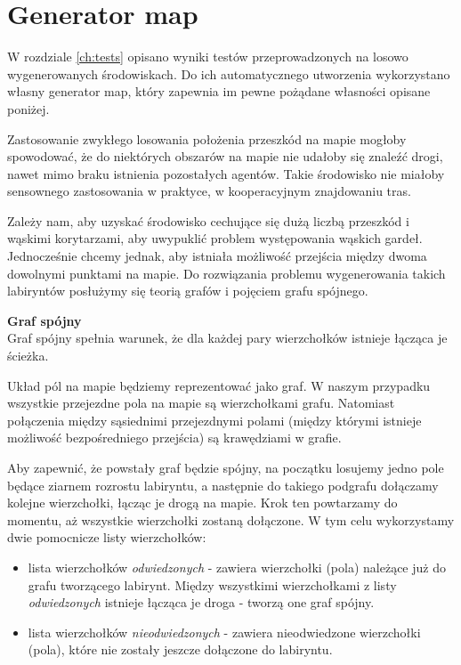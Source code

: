 \section{Generator map}
\label{ch:mazegen}

W rozdziale \ref{ch:tests} opisano wyniki testów przeprowadzonych na losowo wygenerowanych środowiskach.
Do ich automatycznego utworzenia wykorzystano własny generator map, który zapewnia im pewne pożądane własności opisane poniżej.

Zastosowanie zwykłego losowania położenia przeszkód na mapie mogłoby spowodować, że do niektórych obszarów na mapie nie udałoby się znaleźć drogi, nawet mimo braku istnienia pozostałych agentów. Takie środowisko nie miałoby sensownego zastosowania w praktyce, w kooperacyjnym znajdowaniu tras.

Zależy nam, aby uzyskać środowisko cechujące się dużą liczbą przeszkód i wąskimi korytarzami, aby uwypuklić problem występowania wąskich gardeł. Jednocześnie chcemy jednak, aby istniała możliwość przejścia między dwoma dowolnymi punktami na mapie.
Do rozwiązania problemu wygenerowania takich labiryntów posłużymy się teorią grafów i pojęciem grafu spójnego.

\begin{definition}{\bf Graf spójny\\}
	Graf spójny spełnia warunek, że dla każdej pary wierzchołków istnieje łącząca je ścieżka.
\end{definition}

Układ pól na mapie będziemy reprezentować jako graf.
W naszym przypadku wszystkie przejezdne pola na mapie są wierzchołkami grafu. Natomiast połączenia między sąsiednimi przejezdnymi polami (między którymi istnieje możliwość bezpośredniego przejścia) są krawędziami w grafie.

Aby zapewnić, że powstały graf będzie spójny, na początku losujemy jedno pole będące ziarnem rozrostu labiryntu, a następnie do takiego podgrafu dołączamy kolejne wierzchołki, łącząc je drogą na mapie. Krok ten powtarzamy do momentu, aż wszystkie wierzchołki zostaną dołączone.
W tym celu wykorzystamy dwie pomocnicze listy wierzchołków:
\begin{itemize}
	\item lista wierzchołków {\it odwiedzonych} - zawiera wierzchołki (pola) należące już do grafu tworzącego labirynt. Między wszystkimi wierzchołkami z listy {\it odwiedzonych} istnieje łącząca je droga - tworzą one graf spójny.
	\item lista wierzchołków {\it nieodwiedzonych} - zawiera nieodwiedzone wierzchołki (pola), które nie zostały jeszcze dołączone do labiryntu.
\end{itemize}

